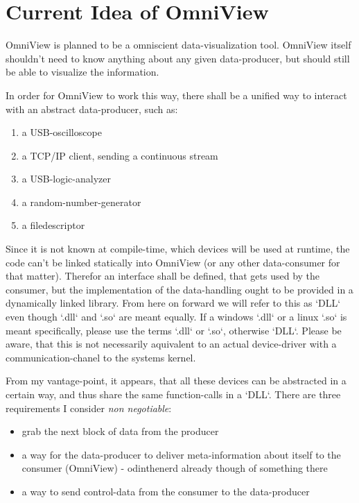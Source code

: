 \documentclass[]{scrreprt}
\begin{document}
\chapter{Current Idea of OmniView}
OmniView is planned to be a omniscient data-visualization tool. OmniView itself shouldn't need to know anything about any given data-producer, but should still be able to visualize the information.

In order for OmniView to work this way, there shall be a unified way to interact with an abstract data-producer, such as:
\begin{enumerate}
    \item a USB-oscilloscope
    \item a TCP/IP client, sending a continuous stream
    \item a USB-logic-analyzer
    \item a random-number-generator
    \item a filedescriptor
\end{enumerate}

Since it is not known at compile-time, which devices will be used at runtime, the code can't be linked statically into OmniView (or any other data-consumer for that matter). Therefor an interface shall be defined, that gets used by the consumer, but the implementation of the data-handling ought to be provided in a dynamically linked library. From here on forward we will refer to this as `DLL` even though `.dll` and `.so` are meant equally. If a windows `.dll` or a linux `.so` is meant specifically, please use the terms `.dll` or `.so`, otherwise `DLL`. Please be aware, that this is not necessarily aquivalent to an actual device-driver with a communication-chanel to the systems kernel.

From my vantage-point, it appears, that all these devices can be abstracted in a certain way, and thus share the same function-calls in a `DLL`.
There are three requirements I consider \textit{non negotiable}:
\begin{itemize}
    \item grab the next block of data from the producer
    \item a way for the data-producer to deliver meta-information about itself to the consumer (OmniView) - odinthenerd already though of something there
    \item a way to send control-data from the consumer to the data-producer
\end{itemize}
\end{document}
